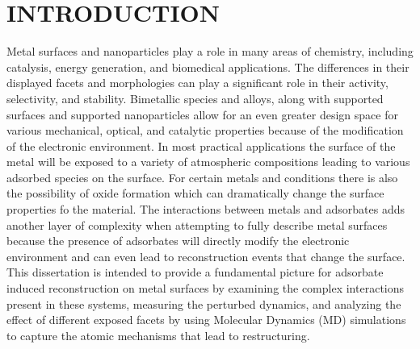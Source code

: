 %

\chapter{INTRODUCTION}
Metal surfaces and nanoparticles play a role in many areas of chemistry,
including catalysis\citep{}, energy generation\citep{}, and biomedical
applications.\citep{} The differences in their displayed facets and
morphologies can play a significant role in their activity\citep{},
selectivity\citep{}, and stability\citep{}. Bimetallic species and
alloys\citep{}, along with supported surfaces and supported
nanoparticles\citep{} allow for an even greater design space for various
mechanical\citep{}, optical\citep{}, and catalytic properties\citep{} because
of the modification of the electronic environment.  In most practical
applications the surface of the metal will be exposed to a variety of
atmospheric compositions leading to various adsorbed species on the surface.
For certain metals and conditions there is also the possibility of oxide
formation which can dramatically change the surface properties fo the
material.\citep{} The interactions between metals and adsorbates adds another
layer of complexity when attempting to fully describe metal surfaces because
the presence of adsorbates will directly modify the electronic environment and
can even lead to reconstruction events that change the surface.\citep{} This
dissertation is intended to provide a fundamental picture for adsorbate induced
reconstruction on metal surfaces by examining the complex interactions present
in these systems, measuring the perturbed dynamics, and analyzing the effect of
different exposed facets by using Molecular Dynamics (MD) simulations to
capture the atomic mechanisms that lead to restructuring.


